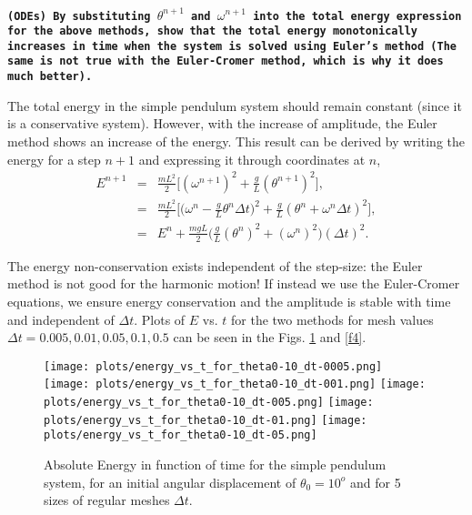 \documentclass[12pt]{article}
\newcounter{question}[section]
\newcommand{\question}[2] {\vspace{.25in} \fbox{#1} #2 \vspace{.10in}}
\begin{document}
\quad

\newpage


{\color{MidnightBlue}
\question{Q.2}{\texttt{{\bf(ODEs)} {\bf By substituting $\theta^{n+1}$ and $\omega^{n+1}$ into the total energy expression for the above methods, show that
the total energy monotonically increases in time when the system is solved using Euler's method (The same is not true with the Euler-Cromer method, which is why it does much better).
}}}}


\quad

The total energy in the simple pendulum system should remain constant (since it is a conservative system). However, with the increase of amplitude, the Euler method shows an increase of the energy. This result can be derived  by writing the energy for a step $n+1$ and expressing it through coordinates at $n$,
\begin{eqnarray*}
 E^{n+1} &=&  \frac{mL^2}{2} \Bigg [ (\omega^{n+1})^2 + \frac{g}{L} (\theta^{n+1})^2 \Bigg],\\
&=& \frac{mL^2}{2} \Bigg [ \Bigg ( \omega^n - \frac{g}{L} \theta^n \Delta t \Bigg)^2 + \frac{g}{L} (\theta^n + \omega^n \Delta t)^2 \Bigg ], \\
&=& E^n + \frac{mgL}{2} \Bigg (\frac{g}{L}(\theta^n)^2 + (\omega^n)^2 \Bigg) (\Delta t)^2.
\end{eqnarray*}

\quad

The energy non-conservation exists independent of the step-size: the Euler method is not good for the harmonic motion! If instead we use the Euler-Cromer equations,  we ensure  energy conservation and the amplitude is stable with time and independent of $\Delta t$. Plots of  $E$ vs. $t$ for the two methods for mesh values $\Delta t = 0.005, 0.01, 0.05, 0.1, 0.5$ can be seen in the Figs. \ref{f3} and \ref{f4}.



\begin{figure} [ht]
\begin{center}
\texttt{[image: plots/energy\_vs\_t\_for\_theta0-10\_dt-0005.png]} 
\texttt{[image: plots/energy\_vs\_t\_for\_theta0-10\_dt-001.png]} 
\texttt{[image: plots/energy\_vs\_t\_for\_theta0-10\_dt-005.png]} 
\texttt{[image: plots/energy\_vs\_t\_for\_theta0-10\_dt-01.png]} 
\texttt{[image: plots/energy\_vs\_t\_for\_theta0-10\_dt-05.png]} 
\caption{Absolute Energy in function of time for the simple pendulum system, for an initial angular displacement of $\theta_0=10^o$ and for 5 sizes of regular meshes $\Delta t$.}
\label{f3}
\end{center}
\end{figure}
\end{document}
